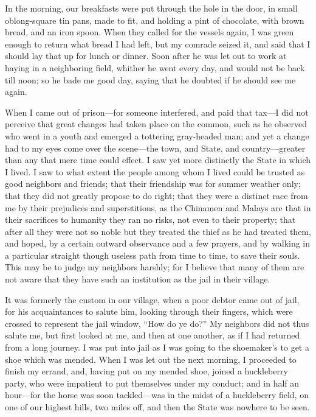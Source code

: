 \documentclass[letterpaper,12pt]{article}
\begin{document}
In the morning, our breakfasts were put through the hole in the door, in small
oblong-square tin pans, made to fit, and holding a pint of chocolate, with brown
bread, and an iron spoon. When they called for the vessels again, I was green
enough to return what bread I had left, but my comrade seized it, and said that
I should lay that up for lunch or dinner. Soon after he was let out to work at
haying in a neighboring field, whither he went every day, and would not be back
till noon; so he bade me good day, saying that he doubted if he should see me
again.

When I came out of prison---for someone interfered, and paid that tax---I did
not perceive that great changes had taken place on the common, such as he
observed who went in a youth and emerged a tottering gray-headed man; and yet
a change had to my eyes come over the scene---the town, and State, and
country---greater than any that mere time could effect. I saw yet more
distinctly the State in which I lived. I saw to what extent the people among
whom I lived could be trusted as good neighbors and friends; that their
friendship was for summer weather only; that they did not greatly propose to do
right; that they were a distinct race from me by their prejudices and
superstitions, as the Chinamen and Malays are that in their sacrifices to
humanity they ran no risks, not even to their property; that after all they were
not so noble but they treated the thief as he had treated them, and hoped, by
a certain outward observance and a few prayers, and by walking in a particular
straight though useless path from time to time, to save their souls. This may be
to judge my neighbors harshly; for I believe that many of them are not aware
that they have such an institution as the jail in their village.

It was formerly the custom in our village, when a poor debtor came out of jail,
for his acquaintances to salute him, looking through their fingers, which were
crossed to represent the jail window, \enquote{How do ye do?} My neighbors did
not thus salute me, but first looked at me, and then at one another, as if I had
returned from a long journey. I was put into jail as I was going to the
shoemaker's to get a shoe which was mended. When I was let out the next morning,
I proceeded to finish my errand, and, having put on my mended shoe, joined
a huckleberry party, who were impatient to put themselves under my conduct; and
in half an hour---for the horse was soon tackled---was in the midst of
a huckleberry field, on one of our highest hills, two miles off, and then the
State was nowhere to be seen.
\end{document}
